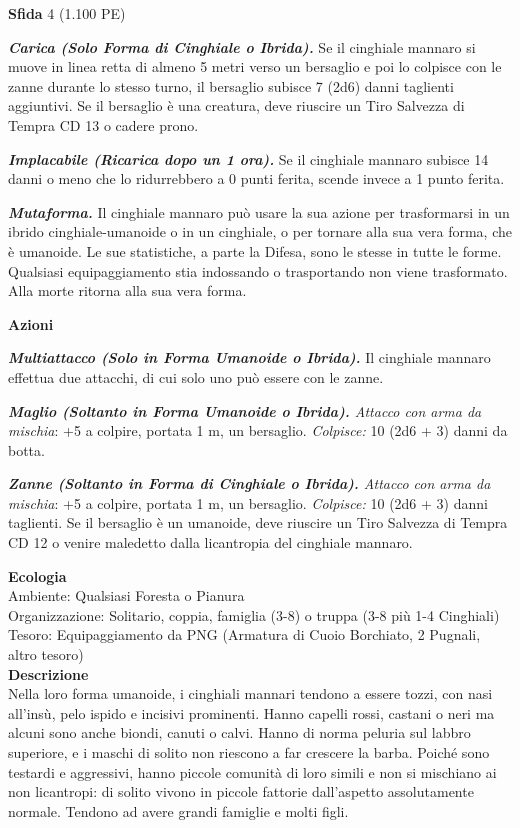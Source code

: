 \begin{multicols}{2}
\textbf{Sfida} 4 (1.100 PE)

\emph{\textbf{Carica (Solo Forma di Cinghiale o Ibrida).}} Se il cinghiale mannaro si muove in linea retta di almeno 5 metri verso un bersaglio e poi lo colpisce con le zanne durante lo stesso turno, il bersaglio subisce 7 (2d6) danni taglienti aggiuntivi. Se il bersaglio è una creatura, deve riuscire un Tiro Salvezza di Tempra CD 13 o cadere prono.

\emph{\textbf{Implacabile (Ricarica dopo un 1 ora).}} Se il cinghiale mannaro subisce 14 danni o meno che lo ridurrebbero a 0 punti ferita, scende invece a 1 punto ferita.

\emph{\textbf{Mutaforma.}} Il cinghiale mannaro può usare la sua azione per trasformarsi in un ibrido cinghiale-umanoide o in un cinghiale, o per tornare alla sua vera forma, che è umanoide. Le sue statistiche, a parte la Difesa, sono le stesse in tutte le forme. Qualsiasi equipaggiamento stia indossando o trasportando non viene trasformato. Alla morte ritorna alla sua vera forma.

\textbf{Azioni}

\emph{\textbf{Multiattacco (Solo in Forma Umanoide o Ibrida).}} Il cinghiale mannaro effettua due attacchi, di cui solo uno può essere con le zanne.

\emph{\textbf{Maglio (Soltanto in Forma Umanoide o Ibrida).} Attacco con arma da mischia}: +5 a colpire, portata 1 m, un bersaglio. \emph{Colpisce:} 10 (2d6 + 3) danni da botta.

\emph{\textbf{Zanne (Soltanto in Forma di Cinghiale o Ibrida).} Attacco con arma da mischia}: +5 a colpire, portata 1 m, un bersaglio. \emph{Colpisce:} 10 (2d6 + 3) danni taglienti. Se il bersaglio è un umanoide, deve riuscire un Tiro Salvezza di Tempra CD 12 o venire maledetto dalla licantropia del cinghiale mannaro.

\textbf{Ecologia}\\
Ambiente: Qualsiasi Foresta o Pianura\\
Organizzazione: Solitario, coppia, famiglia (3-8) o truppa (3-8 più 1-4 Cinghiali)\\
Tesoro: Equipaggiamento da PNG (Armatura di Cuoio Borchiato, 2 Pugnali, altro tesoro)\\
\textbf{Descrizione}\\
Nella loro forma umanoide, i cinghiali mannari tendono a essere tozzi, con nasi all'insù, pelo ispido e incisivi prominenti. Hanno capelli rossi, castani o neri ma alcuni sono anche biondi, canuti o calvi. Hanno di norma peluria sul labbro superiore, e i maschi di solito non riescono a far crescere la barba. Poiché sono testardi e aggressivi, hanno piccole comunità di loro simili e non si mischiano ai non licantropi: di solito vivono in piccole fattorie dall'aspetto assolutamente normale. Tendono ad avere grandi famiglie e molti figli.\\




\end{multicols}
